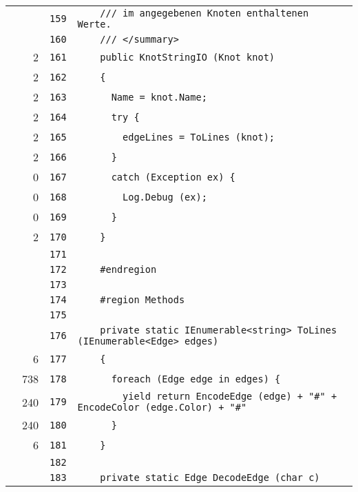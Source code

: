 \documentclass[a4paper,10pt]{article}
\begin{document}
\begin{longtable}[l]{lrrl}
\cellcolor{gray} &  & \verb~159~ & \verb~    /// im angegebenen Knoten enthaltenen Werte.~\\
\cellcolor{gray} &  & \verb~160~ & \verb~    /// </summary>~\\
\cellcolor{green} & 2 & \verb~161~ & \verb~    public KnotStringIO (Knot knot)~\\
\cellcolor{green} & 2 & \verb~162~ & \verb~    {~\\
\cellcolor{green} & 2 & \verb~163~ & \verb~      Name = knot.Name;~\\
\cellcolor{green} & 2 & \verb~164~ & \verb~      try {~\\
\cellcolor{green} & 2 & \verb~165~ & \verb~        edgeLines = ToLines (knot);~\\
\cellcolor{green} & 2 & \verb~166~ & \verb~      }~\\
\cellcolor{red} & 0 & \verb~167~ & \verb~      catch (Exception ex) {~\\
\cellcolor{red} & 0 & \verb~168~ & \verb~        Log.Debug (ex);~\\
\cellcolor{red} & 0 & \verb~169~ & \verb~      }~\\
\cellcolor{green} & 2 & \verb~170~ & \verb~    }~\\
\cellcolor{gray} &  & \verb~171~ & \verb~~\\
\cellcolor{gray} &  & \verb~172~ & \verb~    #endregion~\\
\cellcolor{gray} &  & \verb~173~ & \verb~~\\
\cellcolor{gray} &  & \verb~174~ & \verb~    #region Methods~\\
\cellcolor{gray} &  & \verb~175~ & \verb~~\\
\cellcolor{gray} &  & \verb~176~ & \verb~    private static IEnumerable<string> ToLines (IEnumerable<Edge> edges)~\\
\cellcolor{green} & 6 & \verb~177~ & \verb~    {~\\
\cellcolor{green} & 738 & \verb~178~ & \verb~      foreach (Edge edge in edges) {~\\
\cellcolor{green} & 240 & \verb~179~ & \verb~        yield return EncodeEdge (edge) + "#" + EncodeColor (edge.Color) + "#" ~\\
\cellcolor{green} & 240 & \verb~180~ & \verb~      }~\\
\cellcolor{green} & 6 & \verb~181~ & \verb~    }~\\
\cellcolor{gray} &  & \verb~182~ & \verb~~\\
\cellcolor{gray} &  & \verb~183~ & \verb~    private static Edge DecodeEdge (char c)~\\

\end{longtable}
\end{document}
